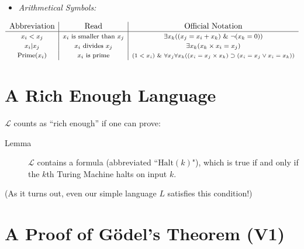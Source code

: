 \documentclass[12pt]{extarticle}
\begin{document}
\begin{itemize}

\vspace{2mm}

\item \emph{Arithmetical Symbols:}

\end{itemize}

\vspace{-4mm}

\[
\begin{array}{c|c|c}
 \text{{Abbreviation}}  &\text{{Read}} &\text{{Official Notation}}   \\
\hline
\text{\footnotesize $x_i < x_j$}  & \text{\footnotesize  $x_i$ is smaller than $x_j$}  & \text{\footnotesize  \(\exists x_k( (x_j = x_i + x_k) \ \& \ \neg(x_k = 0))\)}\\
\text{\footnotesize $x_i |  x_j$}  & \text{\footnotesize  $x_i$ divides $x_j$}  & \text{\footnotesize  \(\exists x_k (x_k \times x_i = x_j)\)}\\
\text{\footnotesize $\text{Prime}(x_i)$}  & \text{\footnotesize  $x_i$ is prime}  & \text{\scriptsize  \((1< x_i) \ \&\ \forall x_j\forall x_k((x_i = x_j\times x_k)\supset(x_i=x_j\vee x_i=x_k))\)}\\
\end{array}
\]



\section{A Rich Enough Language}

$\mathcal{L}$ counts as ``rich enough'' if one can prove:

\begin{description}
\item[Lemma] $\mathcal{L}$ contains a formula (abbreviated ``\(\mbox{Halt}(k)\)"), which is true if and only if the $k$th Turing Machine halts on input \(k\).
\end{description}

\noindent
(As it turns out, even our simple language $L$ satisfies this condition!)






\section{A Proof of G\"odel's Theorem (V1)}
\end{document}
